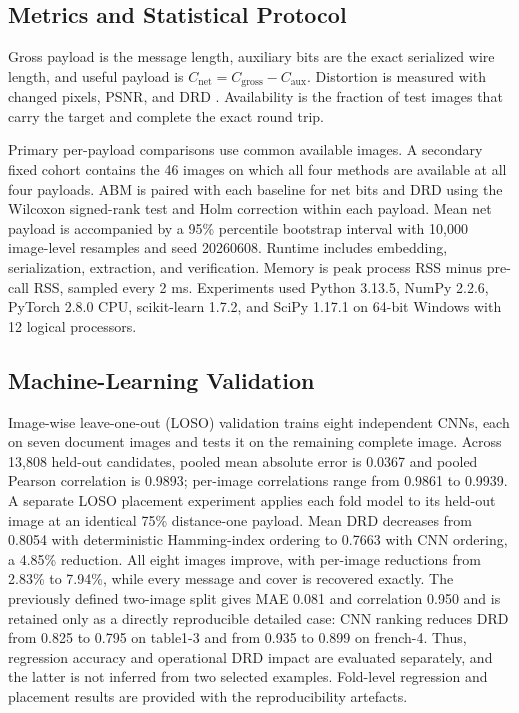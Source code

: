 \documentclass[a4paper,fleqn]{cas-dc}
\begin{document}
\subsection{Metrics and Statistical Protocol}

Gross payload is the message length, auxiliary bits are the exact serialized
wire length, and useful payload is
$C_{\mathrm{net}}=C_{\mathrm{gross}}-C_{\mathrm{aux}}$. Distortion is measured
with changed pixels, PSNR, and DRD \cite{3535}. Availability is the fraction of
test images that carry the target and complete the exact round trip.

Primary per-payload comparisons use common available images. A secondary fixed
cohort contains the 46 images on which all four methods are available at all
four payloads. ABM is paired with each baseline for net bits and DRD using the
Wilcoxon signed-rank test and Holm correction within each payload. Mean net
payload is accompanied by a 95\% percentile bootstrap interval with 10,000
image-level resamples and seed 20260608. Runtime includes embedding,
serialization, extraction, and verification. Memory is peak process RSS minus
pre-call RSS, sampled every 2 ms. Experiments used Python 3.13.5, NumPy 2.2.6,
PyTorch 2.8.0 CPU, scikit-learn 1.7.2, and SciPy 1.17.1 on 64-bit Windows with
12 logical processors.

\subsection{Machine-Learning Validation}

Image-wise leave-one-out (LOSO) validation trains eight independent CNNs, each
on seven document images and tests it on the remaining complete image. Across
13,808 held-out candidates, pooled mean absolute error is 0.0367 and pooled
Pearson correlation is 0.9893; per-image correlations range from 0.9861 to
0.9939. A separate LOSO placement experiment applies each fold model to its
held-out image at an identical 75\% distance-one payload. Mean DRD decreases
from 0.8054 with deterministic Hamming-index ordering to 0.7663 with CNN
ordering, a 4.85\% reduction. All eight images improve, with per-image
reductions from 2.83\% to 7.94\%, while every message and cover is recovered
exactly. The previously defined two-image split gives MAE 0.081 and correlation
0.950 and is retained only as a directly reproducible detailed case:
CNN ranking reduces DRD from 0.825 to 0.795 on table1-3 and from 0.935 to 0.899
on french-4. Thus, regression accuracy and operational DRD impact are evaluated
separately, and the latter is not inferred from two selected examples.
Fold-level regression and placement results are provided with the
reproducibility artefacts.
\end{document}
